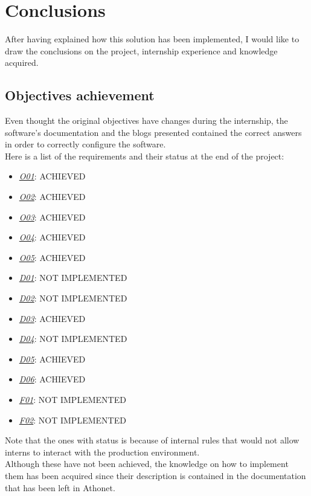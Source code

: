 \chapter{Conclusions}
\label{conclusions}

After having explained how this solution has been implemented, I would like to draw the conclusions on the project, internship experience and knowledge acquired.

\section{Objectives achievement}
	Even thought the original objectives have changes during the internship, the software's documentation and the blogs presented contained the correct answers in order to correctly configure the software.\\
	Here is a list of the requirements and their status at the end of the project:
	\begin{itemize}
		\item \underline{\textit{O01}}: ACHIEVED
		\item \underline{\textit{O02}}: ACHIEVED
		\item \underline{\textit{O03}}: ACHIEVED
		\item \underline{\textit{O04}}: ACHIEVED
		\item \underline{\textit{O05}}: ACHIEVED
		\item \underline{\textit{D01}}: NOT IMPLEMENTED
		\item \underline{\textit{D02}}: NOT IMPLEMENTED
		\item \underline{\textit{D03}}: ACHIEVED
		\item \underline{\textit{D04}}: NOT IMPLEMENTED
		\item \underline{\textit{D05}}: ACHIEVED
		\item \underline{\textit{D06}}: ACHIEVED
		\item \underline{\textit{F01}}: NOT IMPLEMENTED
		\item \underline{\textit{F02}}: NOT IMPLEMENTED
	\end{itemize} 
	Note that the ones with  status is because of internal rules that would not allow interns to interact with the production environment.\\
	Although these have not been achieved, the knowledge on how to implement them has been acquired since their description is contained in the documentation that has been left in Athonet.


